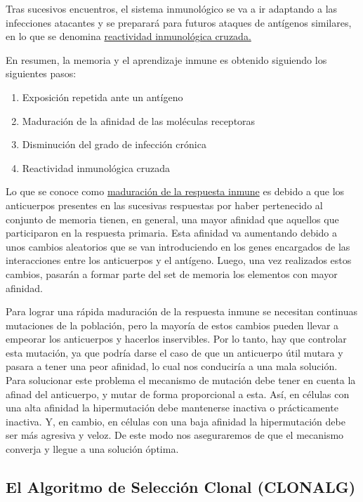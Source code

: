 \documentclass[10pt,a4paper]{article}
\begin{document}
	Tras sucesivos encuentros, el sistema inmunológico se va a ir adaptando a las infecciones atacantes y se preparará para futuros ataques de antígenos similares, en lo que se denomina \underline{reactividad inmunológica cruzada.}

	En resumen, la memoria y el aprendizaje inmune es obtenido siguiendo los siguientes pasos:
	\begin{enumerate}
		\item Exposición repetida ante un antígeno
		\item Maduración de la afinidad de las moléculas receptoras		
		\item Disminución del grado de infección crónica
		\item Reactividad inmunológica cruzada
	\end{enumerate}

	Lo que se conoce como \underline{maduración de la respuesta inmune} es debido a que
	los anticuerpos presentes en las sucesivas respuestas por haber pertenecido al
	conjunto de memoria tienen, en general, una mayor afinidad que aquellos que
	participaron en la respuesta primaria. Esta afinidad va aumentando debido a unos
	cambios aleatorios que se van introduciendo en los genes encargados de las
	interacciones entre los anticuerpos y el antígeno. Luego, una vez realizados estos
	cambios, pasarán a formar parte del set de memoria los elementos con mayor
	afinidad.

	Para lograr una rápida maduración de la respuesta inmune se necesitan
	continuas mutaciones de la población, pero la mayoría de estos cambios pueden
	llevar a empeorar los anticuerpos y hacerlos inservibles. Por lo tanto, hay que
	controlar esta mutación, ya que podría darse el caso de que un anticuerpo útil
	mutara y pasara a tener una peor afinidad, lo cual nos conduciría a una mala
	solución. Para solucionar este problema el mecanismo de mutación debe tener en
	cuenta la afinad del anticuerpo, y mutar de forma proporcional a esta. Así, en
	células con una alta afinidad la hipermutación debe mantenerse inactiva o
	prácticamente inactiva. Y, en cambio, en células con una baja afinidad la
	hipermutación debe ser más agresiva y veloz. De este modo nos aseguraremos de
	que el mecanismo converja y llegue a una solución óptima.

	\subsection{El Algoritmo de Selección Clonal (CLONALG)}
	
\end{document}
